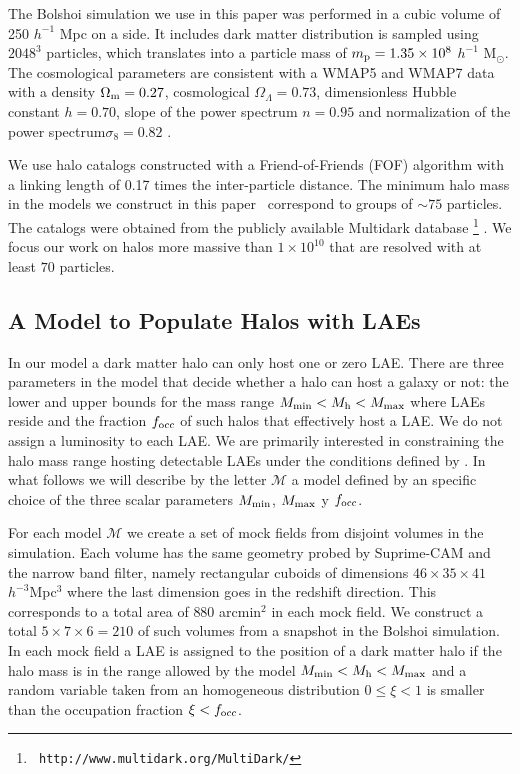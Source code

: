 \documentclass[usenatbib]{mn2e}
\newcommand{\documentname}{paper~}
\newcommand{\hMsun}{{\ifmmode{h^{-1}{\rm
        {M_{\odot}}}}\else{$h^{-1}{\rm{M_{\odot}}}$}\fi}}
\begin{document}
The Bolshoi simulation \citep{Bolshoi} we use in this paper was
performed in a cubic volume of 250 $h^{-1}$ Mpc on a side. It includes
dark matter distribution is sampled using $2048^{3}$ particles, which
translates into a particle mass of $m_{\rm   p}=1.35\times 10^{8}$
$h^{-1}$ M$_{\odot}$.  The cosmological parameters are consistent with
a WMAP5 and WMAP7 data with a  density $\Omega_{\rm m} = 0.27$,
cosmological  $\Omega_{\Lambda}=0.73$, dimensionless Hubble constant
$h=0.70$, slope of the power spectrum $n=0.95$ and normalization of the
power spectrum$\sigma_{8}=0.82$ \citep{Komatsu2009,Jarosik2011}.  

We use halo catalogs constructed with a Friend-of-Friends (FOF)
algorithm with a linking length of 0.17 times the inter-particle
distance. The minimum halo mass in the models we construct in this \documentname
correspond to groups of $\sim 75$ particles. The catalogs were
obtained from the publicly available Multidark database \footnote{{\tt
    http://www.multidark.org/MultiDark/}} \citep{2011arXiv1109.0003R}.
We focus our work on halos more massive than $1\times 10^{10}$\hMsun
that are resolved with at least $70$ particles.


\subsection{A Model to Populate Halos with LAEs}
\label{subsec:mocks}

In our model a dark matter halo can only host one or zero LAE. 
There are three parameters in the model that decide whether a halo can host a
galaxy or not: the lower and upper bounds for the mass range $M_{\rm min}<
M_{\rm h} < M_{\rm max}$ where LAEs reside and the fraction $f_{\rm
  occ}$ of such halos that effectively host a LAE. We do not assign a
luminosity to each LAE. We are primarily interested in
constraining the halo mass range hosting detectable LAEs under the
conditions defined by \cite{Yamada2012}. In what follows we will describe by
the letter ${\mathcal M}$ a model defined by an specific choice of the
three scalar parameters $M_{\rm min}$, $M_{\rm  max}$ y $f_{\rm occ}$.  


For each model ${\mathcal M}$ we create a set of mock fields from
disjoint volumes in the simulation. Each volume has the same geometry
probed by Suprime-CAM and the narrow band filter, namely rectangular
cuboids of dimensions $46\times 35\times 41$ $h^{-3}$Mpc$^{3}$ where
the last dimension goes in the redshift direction. This corresponds to
a total area of $880$ arcmin$^{2}$ in each mock field. We construct a total
$5\times 7 \times 6=210$ of such volumes from a snapshot in the Bolshoi
simulation. In each mock field a LAE is assigned to the position of a
dark matter halo if the halo mass is in the range allowed by the model
$M_{\rm min}<M_{\rm h}<M_{\rm max}$ and a random variable taken from
an homogeneous distribution $0\leq \xi<1$ is smaller than the occupation
fraction $\xi<f_{\rm occ}$.
\end{document}
